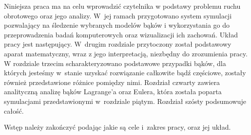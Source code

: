Niniejsza praca ma na celu wprowadzić czytelnika w podstawy problemu ruchu obrotowego oraz jego analizy. W~jej ramach przygotowano system symulacji pozwalający na śledzenie wybranych modelów bąków i wykorzystania go do przeprowadzenia badań komputerowych oraz wizualizacji ich zachowań. Układ pracy jest następujący. W~drugim rozdziale przytoczony został podstawowy aparat matematyczny, wraz z jego interpretacją, niezbędny do zrozumienia pracy. W rozdziale trzecim scharakteryzowano podstawowe przypadki bąków, dla których jesteśmy w~stanie uzyskać rozwiązanie całkowite bądź częściowe, zostały również przedstawione różnice pomiędzy nimi. Rozdział czwarty zawiera analityczną analizę bąków Lagrange'a oraz Eulera, która została poparta symulacjami przedstawionymi w~rozdziale piątym. Rozdział szósty podsumowuje całość.

{\red
  Wstęp należy zakończyć podając jakie są cele i~zakres pracy, oraz jej układ.}


